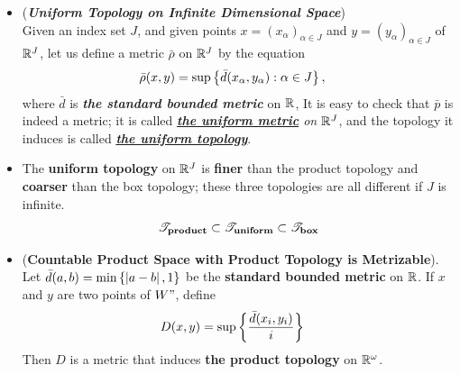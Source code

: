\documentclass[11pt]{article}
\begin{document}
\begin{itemize}
\item \begin{definition}(\emph{\textbf{Uniform Topology on Infinite Dimensional Space}})\\
Given an index set $J$, and given points $x = (x_{\alpha})_{\alpha \in J}$ and $y = (y_{\alpha})_{\alpha \in J}$ of ${\mathbb R}^{J}$, let us define a metric $\bar{\rho}$ on ${\mathbb R}^{J}$ by the equation
\begin{align*}
\bar{\rho}(x, y) &= \sup\left\{\bar{d}(x_{\alpha}, y_{\alpha}): \alpha \in J\right\},
\end{align*}
where $\bar{d}$ is \emph{\textbf{the standard bounded metric}} on ${\mathbb R}$, It is easy to check that $\bar{p}$ is indeed a metric; it is called \emph{\underline{\textbf{the uniform metric}} on ${\mathbb R}^{J}$}, and the topology it induces is called \underline{\emph{\textbf{the uniform topology}}}.
\end{definition}

\item \begin{proposition}
The \textbf{uniform topology} on ${\mathbb R}^{J}$ is \textbf{finer} than the product topology and \textbf{coarser} than the box topology; these three topologies are all different if $J$ is infinite.
\begin{align*}
{\mathscr T}_{\textbf{product}} \subset {\mathscr T}_{\textbf{uniform}} \subset {\mathscr T}_{\textbf{box}}
\end{align*}
\end{proposition}

\item \begin{theorem} (\textbf{Countable Product Space with Product Topology is Metrizable}). \citep{munkres2000topology}\\
Let $\bar{d}(a, b) = \min\left\{\left\lvert a - b \right\rvert,  1\right\}$ be the \textbf{standard bounded metric} on ${\mathbb R}$. If $x$ and $y$ are two points of $W"$, define
\begin{align*}
D(x, y) &= \sup\left\{\frac{\bar{d}(x_i, y_i)}{i}\right\}
\end{align*}
Then $D$ is a metric that induces \textbf{the product topology} on ${\mathbb R}^{\omega}$.
\end{theorem}
\end{itemize}
\end{document}
